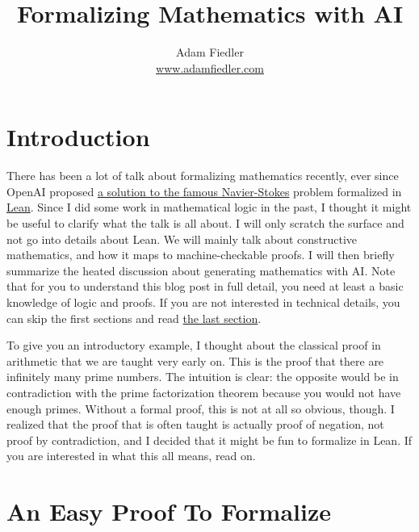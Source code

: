 \documentclass{article}
\title{
    Formalizing Mathematics with AI
}
\author{
    Adam Fiedler\\
    \href{https://adamfiedler.com}{www.adamfiedler.com}
}
\date{}
\begin{document}
\maketitle

\section{Introduction}

There has been a lot of talk about formalizing mathematics recently, ever since OpenAI proposed \href{https://openai.com/index/navier-stokes-solution/}{a solution to the famous Navier-Stokes} problem formalized in \href{https://lean-lang.org}{Lean}. 
Since I did some work in mathematical logic in the past, I thought it might be useful to clarify what the talk is all about.
I will only scratch the surface and not go into details about Lean.
We will mainly talk about constructive mathematics, and how it maps to machine-checkable proofs. 
I will then briefly summarize the heated discussion about generating mathematics with AI.
Note that for you to understand this blog post in full detail, you need at least a basic knowledge of logic and proofs. 
If you are not interested in technical details, you can skip the first sections and read \protect\hyperlink{issues}{the last section}.

To give you an introductory example, I thought about the classical proof in arithmetic that we are taught very early on.
This is the proof that there are infinitely many prime numbers.
The intuition is clear: the opposite would be in contradiction with the prime factorization theorem because you would not have enough primes.
Without a formal proof, this is not at all so obvious, though.
I realized that the proof that is often taught is actually proof of negation, not proof by contradiction, and I decided that it might be fun to formalize in Lean.
If you are interested in what this all means, read on.

\section{An Easy Proof To Formalize}
\label{easyproof}
\end{document}
